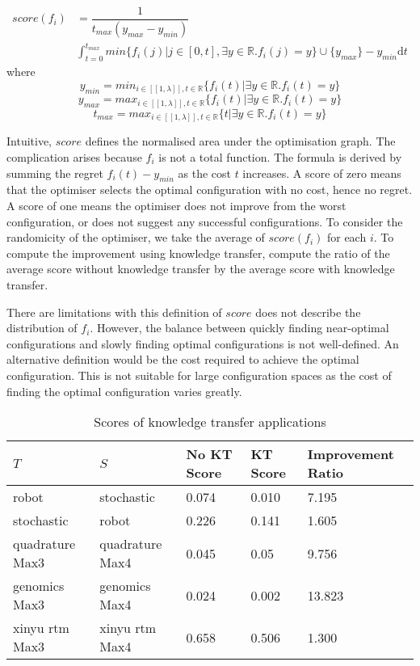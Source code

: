 \documentclass[10pt,a4paper]{article}
\newcommand{\dsb}[1]{[\![#1]\!]}
\begin{document}
\[
	\begin{split}
		score(f_i)&=\dfrac{1}{t_{max}(y_{max}-y_{min})}\\
		&\int_{t=0}^{t_{max}}min\{f_i(j)|j\in[0,t],\exists y\in\mathbb{R}.f_i(j)=y\}\cup\{y_{max}\}-y_{min}\mathrm{d}t
	\end{split}
\]where
\[y_{min}=min_{i\in\dsb{1,\lambda},t\in\mathbb{R}}\{f_i(t)|\exists y\in\mathbb{R}.f_i(t)=y\}\]
\[y_{max}=max_{i\in\dsb{1,\lambda},t\in\mathbb{R}}\{f_i(t)|\exists y\in\mathbb{R}.f_i(t)=y\}\]
\[t_{max}=max_{i\in\dsb{1,\lambda},t\in\mathbb{R}}\{t|\exists y\in\mathbb{R}.f_i(t)=y\}\]

Intuitive, $score$ defines the normalised area under the optimisation graph. The complication arises because $f_i$ is not a total function. The formula is derived by summing the regret $f_i(t)-y_{min}$ as the cost $t$ increases. A score of zero means that the optimiser selects the optimal configuration with no cost, hence no regret. A score of one means the optimiser does not improve from the worst configuration, or does not suggest any successful configurations. To consider the randomicity of the optimiser, we take the average of $score(f_i)$ for each $i$. To compute the improvement using knowledge transfer, compute the ratio of the average score without knowledge transfer by the average score with knowledge transfer.

There are limitations with this definition of $score$ does not describe the distribution of $f_i$. However, the balance between quickly finding near-optimal configurations and slowly finding optimal configurations is not well-defined. An alternative definition would be the cost required to achieve the optimal configuration. This is not suitable for large configuration spaces as the cost of finding the optimal configuration varies greatly.

\begin{table}[H]
	\begin{tabularx}{\linewidth}{X X X X X}
		\hline
		$T$ & $S$ & No KT Score & KT Score & Improvement Ratio\\
		\hline
		robot & stochastic & 0.074 & 0.010 & 7.195\\
		stochastic & robot & 0.226 & 0.141 & 1.605\\
		quadrature Max3 & quadrature Max4 & 0.045 & 0.05 & 9.756\\
		genomics Max3 & genomics Max4 & 0.024 & 0.002 & 13.823\\
		xinyu rtm Max3 & xinyu rtm Max4 & 0.658 & 0.506 & 1.300\\
		\hline
	\end{tabularx}
	\caption{Scores of knowledge transfer applications}
\end{table}
\end{document}
